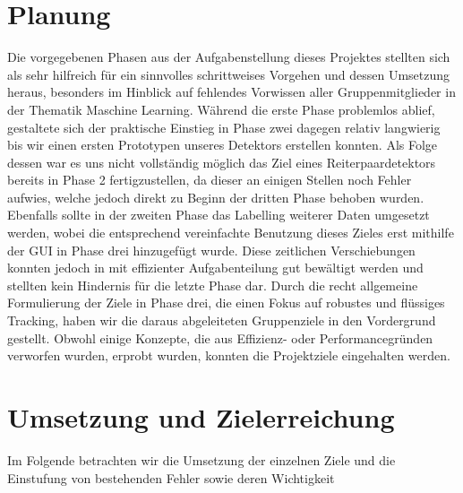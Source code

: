 \section{Planung}
Die vorgegebenen Phasen aus der Aufgabenstellung dieses Projektes stellten sich als sehr hilfreich für ein sinnvolles schrittweises Vorgehen und dessen Umsetzung heraus, besonders im Hinblick auf fehlendes Vorwissen aller Gruppenmitglieder in der Thematik Maschine Learning. Während die erste Phase problemlos ablief, gestaltete sich der praktische Einstieg in Phase zwei dagegen relativ langwierig bis wir einen ersten Prototypen unseres Detektors erstellen konnten. Als Folge dessen war es uns nicht vollständig möglich das Ziel eines Reiterpaardetektors bereits in Phase 2 fertigzustellen, da dieser an einigen Stellen noch Fehler aufwies, welche jedoch direkt zu Beginn der dritten Phase behoben wurden. Ebenfalls sollte in der zweiten Phase das Labelling weiterer Daten umgesetzt werden, wobei die entsprechend vereinfachte Benutzung dieses Zieles erst mithilfe der GUI in Phase drei hinzugefügt wurde. Diese zeitlichen Verschiebungen konnten jedoch in mit effizienter Aufgabenteilung gut bewältigt werden und stellten kein Hindernis für die letzte Phase dar.
Durch die recht allgemeine Formulierung der Ziele in Phase drei, die einen Fokus auf robustes und flüssiges Tracking, haben wir die daraus abgeleiteten Gruppenziele in den Vordergrund gestellt. Obwohl einige Konzepte, die aus Effizienz- oder Performancegründen verworfen wurden, erprobt wurden, konnten die Projektziele eingehalten werden. 

\section{Umsetzung und Zielerreichung}
Im Folgende betrachten wir die Umsetzung der einzelnen Ziele und die Einstufung von bestehenden Fehler sowie deren Wichtigkeit



